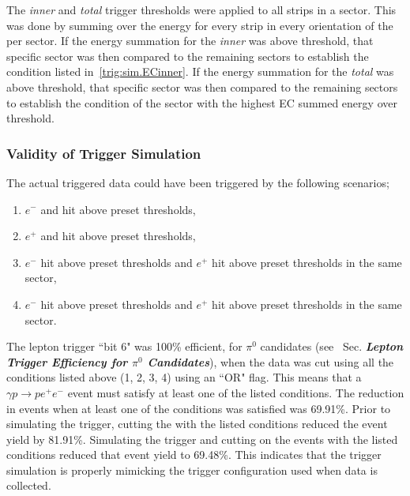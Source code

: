 The  \emph{inner} and  \emph{total} trigger thresholds were applied to all  strips in a sector. This was done by summing over the energy for every strip in every orientation of the  per sector. If the energy summation for the  \emph{inner} was above threshold,   that specific sector was then compared to the remaining sectors to establish the condition listed in~\ref{trig:sim.ECinner}. If the energy summation for the  \emph{total} was above threshold, that specific sector was then compared to the remaining sectors to establish the condition of the sector with the highest EC summed energy over threshold.

\subsubsection{Validity of Trigger Simulation}
The actual triggered data could have been triggered by the following scenarios;
\begin{enumerate}\label{trig:get.all}
\item $e^-$  and  hit above preset thresholds,
\item $e^+$  and  hit above preset thresholds,
\item $e^-$  hit above preset thresholds and $e^+$  hit above preset thresholds in the same sector,
\item $e^-$  hit above preset thresholds and $e^+$  hit above preset thresholds in the same sector.
\end{enumerate}
The lepton trigger ``bit 6" was 100\% efficient, for $\pi^0$ candidates (see~\cite{clas.thesis.kunkel} Sec. \textit{\textbf{Lepton Trigger Efficiency for $\pi^0$ Candidates}}), when the data was cut using all the conditions listed above (1, 2, 3, 4) using an ``OR" flag. This means that a $\gamma p \to p e^+ e^-$ event must satisfy at least one of the listed conditions. The reduction in events when at least one of the conditions was satisfied was 69.91\%. Prior to simulating the trigger, cutting the  with the listed conditions reduced the event yield by 81.91\%. Simulating the trigger and cutting on the  events with the listed conditions reduced that event yield to 69.48\%. This indicates that the trigger simulation is properly mimicking the trigger configuration used when data is collected.

%
%




